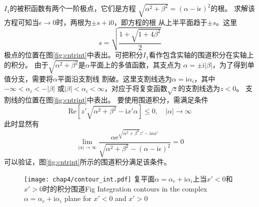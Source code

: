 $I_1$的被积函数有两个一阶极点，它们是方程
$\sqrt{\alpha^2+\beta^2}=(\alpha-\mathrm{i}\epsilon)^2$的根。
求解该方程可知当$\epsilon\to 0$时，两根为$\pm s+\mathrm{i}0$，即方程的根
从上半平面趋于$\pm s$。这里
\begin{equation}
  s=\sqrt{\frac{1+\sqrt{1+4\beta^2}}{2}}
  \label{eq:2poles}
\end{equation}
极点的位置在图\ref{fig:cntrint}中表出。可把积分$I_1$看作包含实轴的围道积分在实轴上的积分。
由于$\sqrt{\alpha^2+\beta^2}$是$\alpha$平面上的多值函数，其支点为
$\alpha=\pm\mathrm{i}|\beta|$，为了得到单值分支，需要将$\alpha$平面沿支割线
割破。这里支割线选为$\alpha=\mathrm{i}\alpha_i$，其中$-\infty<\alpha_i<-|\beta|$
或$|\beta|<\alpha_i<\infty$，对应于将复变函数$\sqrt{z}$的支割线选为$z<0$。
支割线的位置在图\ref{fig:cntrint}中表出。
要使用围道积分，需满足条件
\begin{equation*}
  \mathrm{Re}[z'\sqrt{\alpha^2+\beta^2}-\mathrm{i}x'\alpha]\le 0,
  \quad |\alpha|\to\infty
\end{equation*}
此时显然有
\begin{equation}
  \lim_{|\alpha|\to\infty}\frac{\alpha\mathrm{e}^{\sqrt{\alpha^2+\beta^2}z'-\mathrm{i}\alpha x'}}{\sqrt{\alpha^2+\beta^2}-(\alpha-\mathrm{i}\epsilon)^2}=0
  \label{eq:intcntr}
\end{equation}
可以验证，图\ref{fig:cntrint}所示的围道积分满足该条件。
\begin{figure}[htp]
  \centering
  \captionstyle{\centering}
  \texttt{[image: chap4/contour\_int.pdf]}
  {复平面$\alpha=\alpha_r+\mathrm{i}\alpha_i$上当$x'<0$和$x'>0$时的积分围道}{Fig}
  {Integration contours in the complex $\alpha=\alpha_r+\mathrm{i}\alpha_i$
plane for $x'<0$ and $x'>0$}
\end{figure}

